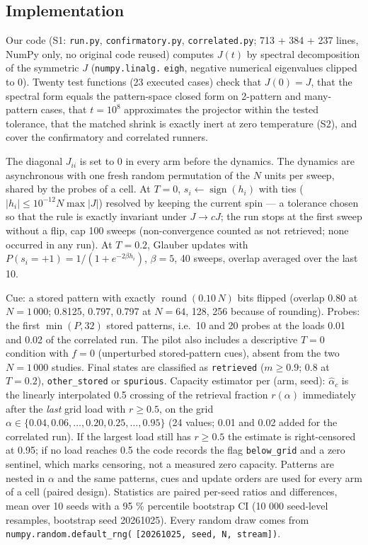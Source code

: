 \subsection{Implementation}\label{implementation}

Our code (S1: \texttt{run.py}, \texttt{confirmatory.py},
\texttt{correlated.py}; 713 + 384 + 237 lines, NumPy only, no original
code reused) computes \(J(t)\) by spectral decomposition of the
symmetric \(J\) (\texttt{numpy.linalg.} \texttt{eigh}, negative
numerical eigenvalues clipped to 0). Twenty test functions (23 executed
cases) check that \(J(0) = J\), that the spectral form equals the
pattern-space closed form on 2-pattern and many-pattern cases, that
\(t = 10^{8}\) approximates the projector within the tested tolerance,
that the matched shrink is exactly inert at zero temperature (S2), and
cover the confirmatory and correlated runners.

The diagonal \(J_{ii}\) is set to 0 in every arm before the dynamics.
The dynamics are asynchronous with one fresh random permutation of the
\(N\) units per sweep, shared by the probes of a cell. At \(T = 0\),
\(s_i \leftarrow \operatorname{sign}(h_i)\) with ties (\(|h_i| \le
10^{-12} N \max|J|\)) resolved by keeping the current spin --- a
tolerance chosen so that the rule is exactly invariant under
\(J \to cJ\); the run stops at the first sweep without a flip, cap 100
sweeps (non-convergence counted as not retrieved; none occurred in any
run). At \(T = 0.2\), Glauber updates with
\(P(s_i = +1) = 1/(1+e^{-2\beta h_i})\), \(\beta = 5\), 40 sweeps,
overlap averaged over the last 10.

Cue: a stored pattern with exactly \(\operatorname{round}(0.10\,N)\)
bits flipped (overlap 0.80 at \(N = 1\,000\); 0.8125, 0.797, 0.797 at
\(N = 64\), 128, 256 because of rounding). Probes: the first
\(\min(P, 32)\) stored patterns, i.e.~10 and 20 probes at the loads 0.01
and 0.02 of the correlated run. The pilot also includes a descriptive
\(T = 0\) condition with \(f = 0\) (unperturbed stored-pattern cues),
absent from the two \(N = 1\,000\) studies. Final states are classified
as \texttt{retrieved} (\(m \ge 0.9\); \(0.8\) at \(T = 0.2\)),
\texttt{other\_stored} or \texttt{spurious}. Capacity estimator per
(arm, seed): \(\hat\alpha_c\) is the linearly interpolated 0.5 crossing
of the retrieval fraction \(r(\alpha)\) immediately after the
\emph{last} grid load with \(r \ge 0.5\), on the grid
\(\alpha \in \{0.04,\allowbreak 0.06,\allowbreak \dots,\allowbreak 0.20,\allowbreak 0.25,\allowbreak \dots,\allowbreak 0.95\}\)
(24 values; 0.01 and 0.02 added for the correlated run). If the largest
load still has \(r \ge 0.5\) the estimate is right-censored at 0.95; if
no load reaches 0.5 the code records the flag \texttt{below\_grid} and a
zero sentinel, which marks censoring, not a measured zero capacity.
Patterns are nested in \(\alpha\) and the same patterns, cues and update
orders are used for every arm of a cell (paired design). Statistics are
paired per-seed ratios and differences, mean over 10 seeds with a 95 \%
percentile bootstrap CI (10 000 seed-level resamples, bootstrap seed
20261025). Every random draw comes from
\texttt{numpy.random.default\_rng(}
\texttt{{[}20261025,\ seed,\ N,\ stream{]})}.

